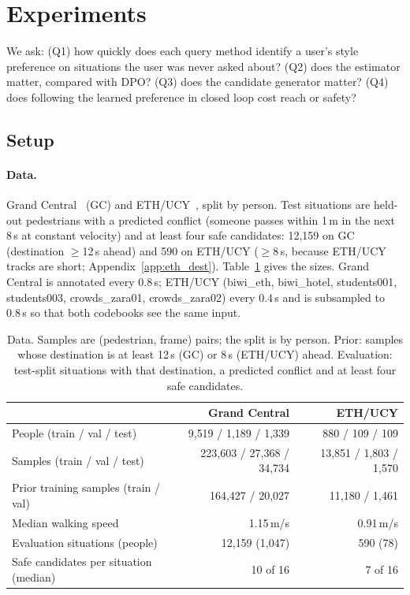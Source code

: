 \section{Experiments}
\label{sec:experiments}

We ask: (Q1) how quickly does each query method identify a user's style preference on situations the user was never asked about?
(Q2) does the estimator matter, compared with DPO? (Q3) does the candidate generator matter? (Q4) does following the learned preference
in closed loop cost reach or safety?

\subsection{Setup}
\paragraph{Data.} Grand Central~\citep{zhou2012understanding} (GC) and ETH/UCY~\citep{pellegrini2009you,lerner2007crowds}, split by person.
Test situations are held-out pedestrians with a predicted conflict (someone passes within 1\,m in the next 8\,s at constant velocity)
and at least four safe candidates: 12{,}159 on GC (destination $\ge$12\,s ahead) and 590 on ETH/UCY ($\ge$8\,s, because ETH/UCY tracks
are short; Appendix~\ref{app:eth_dest}).
Table~\ref{tab:data} gives the sizes. Grand Central is annotated every 0.8\,s; ETH/UCY (biwi\_eth, biwi\_hotel, students001,
students003, crowds\_zara01, crowds\_zara02) every 0.4\,s and is subsampled to 0.8\,s so that both codebooks see the same input.

\begin{table}[t]
\centering
\caption{Data. Samples are (pedestrian, frame) pairs; the split is by person. Prior: samples whose destination is at least 12\,s (GC) or
8\,s (ETH/UCY) ahead. Evaluation: test-split situations with that destination, a predicted conflict and at least four safe candidates.}
\label{tab:data}
\setlength{\tabcolsep}{4pt}
\begin{tabular}{lrr}
\toprule
 & Grand Central & ETH/UCY \\
\midrule
People (train / val / test)        & 9{,}519 / 1{,}189 / 1{,}339 & 880 / 109 / 109 \\
Samples (train / val / test)       & 223{,}603 / 27{,}368 / 34{,}734 & 13{,}851 / 1{,}803 / 1{,}570 \\
Prior training samples (train / val) & 164{,}427 / 20{,}027 & 11{,}180 / 1{,}461 \\
Median walking speed               & 1.15\,m/s & 0.91\,m/s \\
Evaluation situations (people)     & 12{,}159 (1{,}047) & 590 (78) \\
Safe candidates per situation (median) & 10 of 16 & 7 of 16 \\
\bottomrule
\end{tabular}
\end{table}

